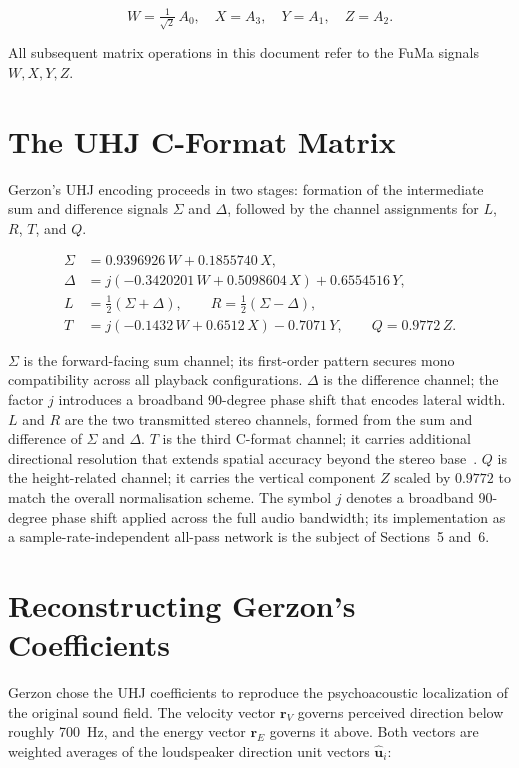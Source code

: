 \documentclass[11pt,a4paper]{article}
\begin{document}
\begin{equation}
W = \tfrac{1}{\sqrt{2}}\,A_0,\quad X = A_3,\quad Y = A_1,\quad Z = A_2 .
\end{equation}

All subsequent matrix operations in this document refer to the FuMa signals $W, X, Y, Z$.

\section{The UHJ C-Format Matrix}

Gerzon's UHJ encoding proceeds in two stages: formation of the intermediate sum and difference signals $\Sigma$ and $\Delta$, followed by the channel assignments for $L$, $R$, $T$, and $Q$.

\begin{align}
\Sigma &= 0.9396926\,W + 0.1855740\,X ,\\
\Delta &= j(-0.3420201\,W + 0.5098604\,X) + 0.6554516\,Y ,\\
L &= \tfrac{1}{2}(\Sigma + \Delta), \qquad R = \tfrac{1}{2}(\Sigma - \Delta),\\
T &= j(-0.1432\,W + 0.6512\,X) - 0.7071\,Y, \qquad Q = 0.9772\,Z .
\end{align}

$\Sigma$ is the forward-facing sum channel; its first-order pattern secures mono compatibility across all playback configurations.
$\Delta$ is the difference channel; the factor $j$ introduces a broadband 90-degree phase shift that encodes lateral width.
$L$ and $R$ are the two transmitted stereo channels, formed from the sum and difference of $\Sigma$ and $\Delta$.
$T$ is the third C-format channel; it carries additional directional resolution that extends spatial accuracy beyond the stereo base~\cite{nycemf_cformat}.
$Q$ is the height-related channel; it carries the vertical component $Z$ scaled by $0.9772$ to match the overall normalisation scheme.
The symbol $j$ denotes a broadband 90-degree phase shift applied across the full audio bandwidth; its implementation as a sample-rate-independent all-pass network is the subject of Sections~5 and~6.
\section{Reconstructing Gerzon's Coefficients}

Gerzon chose the UHJ coefficients to reproduce the psychoacoustic localization of the original sound field.
The velocity vector $\mathbf{r}_V$ governs perceived direction below roughly \SI{700}{\hertz}, and the energy vector $\mathbf{r}_E$ governs it above.
Both vectors are weighted averages of the loudspeaker direction unit vectors $\hat{\mathbf{u}}_i$:
\end{document}
